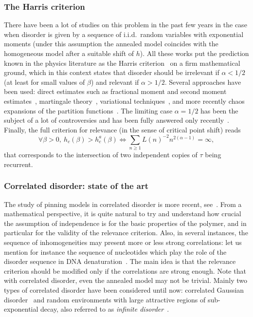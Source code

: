 \documentclass[10pt]{amsart}
\theoremstyle{definition}\newtheorem{defi}[theo]{Definition}\newtheorem{rema}[theo]{Remark}\newtheorem{exam}[theo]{Example}\newtheorem{exem}[theo]{Example}\newtheorem{nota}[theo]{Notation}
\newcommand{\ga}{\alpha}
\newcommand{\gb}{\beta}
\let\oldforall\forall
\renewcommand*{\forall}{\mathrel{\oldforall}}
\begin{document}
\subsubsection{The Harris criterion}

There have been a lot of studies on this problem in the past few years in the case when disorder is given by a sequence of i.i.d.~random variables with exponential moments (under this assumption the annealed model coincides with the homogeneous model after a suitable shift of $h$). All these works put the prediction known in the physics literature as the Harris criterion~\cite{H74} on a firm mathematical ground, which in this context states that disorder should be irrelevant if $\ga < 1/2$ (at least for small values of $\beta$) and relevant if $\ga > 1/2$. Several approaches have been used: direct estimates such as fractional moment and second moment estimates~\cite{AS06, AZ09, BL15, BCPSZ14, CadH13, DGLT09, GiT2006, GTL09}, martingale theory~\cite{L10}, variational techniques~\cite{CdH13}, and more recently chaos expansions of the partition functions~\cite{CSZ16+,CSZ16,CTT16+}. The limiting case $\ga = 1/2$ has been the subject of a lot of controversies and has been fully answered only recently~\cite{BL15}. Finally, the full criterion for relevance (in the sense of critical point shift) reads
\begin{equation}
\forall \gb > 0,\ h_c(\gb) > h_c^a(\gb) \iff \sum_{n \geq 1} L(n)^{- 2} n^{2 (\ga - 1)} = \infty,
\end{equation}
that corresponds to the intersection of two independent copies of $\tau$ being recurrent.

\subsubsection{Correlated disorder: state of the art}

The study of pinning models in correlated disorder is more recent, see~\cite{B13, B14, BL12, BP15, P13}. From a mathematical perspective, it is quite natural to try and understand how crucial the assumption of independence is for the basic properties of the polymer, and in particular for the validity of the relevance criterion. Also, in several instances, the sequence of inhomogeneities may present more or less strong correlations: let us mention for instance the sequence of nucleotides which play the role of the disorder sequence in DNA denaturation~\cite{JPS06}. The main idea is that the relevance criterion should be modified only if the correlations are strong enough. Note that with correlated disorder, even the annealed model may not be trivial. Mainly two types of correlated disorder have been considered until now: correlated Gaussian disorder~\cite{B13, BP15, P13} and random environments with large attractive regions of sub-exponential decay, also referred to as \emph{infinite disorder}~\cite{B14, BL12}.
\end{document}
